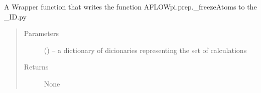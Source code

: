 \documentclass[letterpaper,10pt,english]{sphinxmanual}
\begin{document}

\begin{fulllineitems}
\label{\detokenize{prep:prep.loadlogs}}
\end{fulllineitems}


\begin{fulllineitems}
\label{\detokenize{prep:prep.lockAtomMovement}}
A Wrapper function that writes the function AFLOWpi.prep.\_freezeAtoms to the \_ID.py
\begin{quote}\begin{description}
\item[{Parameters}] \leavevmode
{} () -- a dictionary of dicionaries representing the set of calculations

\item[{Returns}] \leavevmode
None

\end{description}\end{quote}

\end{fulllineitems}

\end{document}
